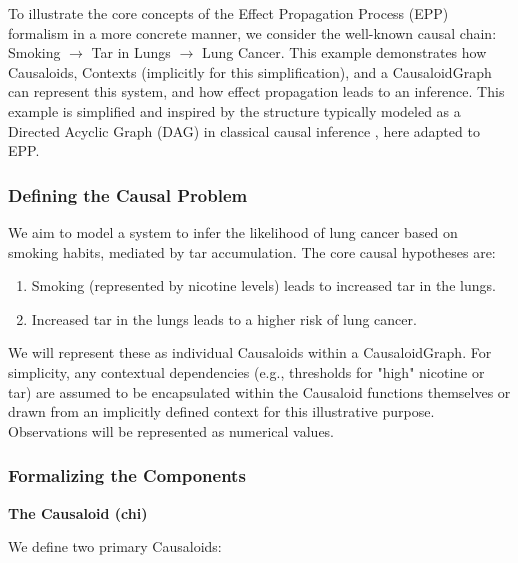 To illustrate the core concepts of the Effect Propagation Process (EPP) formalism in a more concrete manner, we consider the well-known causal chain: Smoking \(\rightarrow\) Tar in Lungs \(\rightarrow\) Lung Cancer. This example demonstrates how Causaloids, Contexts (implicitly for this simplification), and a CausaloidGraph can represent this system, and how effect propagation leads to an inference. This example is simplified and inspired by the structure typically modeled as a Directed Acyclic Graph (DAG) in classical causal inference \cite{pearl2000causality}, here adapted to EPP.

    \subsubsection{Defining the Causal Problem}
    \label{ssec:example_problem_definition}
    We aim to model a system to infer the likelihood of lung cancer based on smoking habits, mediated by tar accumulation. The core causal hypotheses are:
    \begin{enumerate}
        \item Smoking (represented by nicotine levels) leads to increased tar in the lungs.
        \item Increased tar in the lungs leads to a higher risk of lung cancer.
    \end{enumerate}
    We will represent these as individual Causaloids within a CausaloidGraph. For simplicity, any contextual dependencies (e.g., thresholds for "high" nicotine or tar) are assumed to be encapsulated within the Causaloid functions themselves or drawn from an implicitly defined context for this illustrative purpose. Observations will be represented as numerical values.

    \subsubsection{Formalizing the Components}
    \label{ssec:example_formal_components}

\textbf{The Causaloid (chi)}
        
        We define two primary Causaloids:

